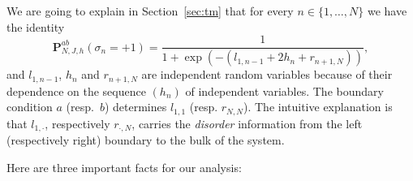 \documentclass[AHL,Unicode,longabstracts,published]{cedram}
\newcommand{\bP}{\mathbf{P}}
\newcommand{\gs}{\sigma}
\begin{document}
We are going to explain in Section~\ref{sec:tm} that for every $n\in \{1, \dots, N\}$ we have the identity
\begin{equation}\label{eq:Psigma0.0}
\bP^{ab}_{ N, J, h}\left(\gs_n=+1\right)=
\frac 1 {1+ \exp\left(-\left(l_{1, n-1} +2h_n+ r_{n+1,N}\right)\right)},
\end{equation}
and $l_{1, n-1}$, $h_n$ and $r_{n+1, N}$ are independent random variables because of their dependence on the sequence $(h_n)$ of independent variables. The boundary condition $a$ (resp.~$b$) determines $l_{1,1}$ (resp. $r_{N,N}$). The intuitive explanation is that $l_{1, \cdot}$, respectively $r_{\cdot, N}$, carries the \emph{disorder} information from the left (respectively right) boundary to the bulk of the system.



Here are three important facts for our analysis:
\end{document}
